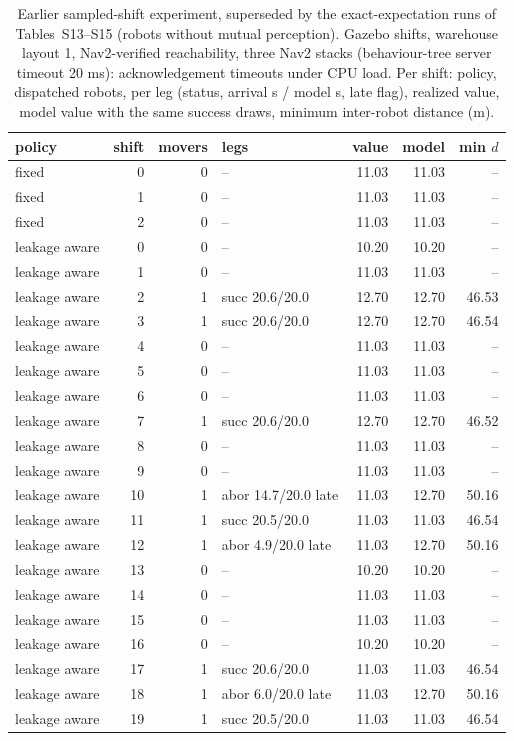 \begin{table}[h]\centering\caption{Earlier sampled-shift experiment, superseded by the exact-expectation runs of Tables~S13--S15 (robots without mutual perception). Gazebo shifts, warehouse layout 1, Nav2-verified reachability, three Nav2 stacks (behaviour-tree server timeout 20 ms): acknowledgement timeouts under CPU load. Per shift: policy, dispatched robots, per leg (status, arrival s / model s, late flag), realized value, model value with the same success draws, minimum inter-robot distance (m).}\scriptsize
\begin{tabular}{@{}lrrp{3.9cm}rrr@{}}\toprule policy & shift & movers & legs & value & model & min $d$\\\midrule
fixed & 0 & 0 & -- & 11.03 & 11.03 & --\\
fixed & 1 & 0 & -- & 11.03 & 11.03 & --\\
fixed & 2 & 0 & -- & 11.03 & 11.03 & --\\
leakage aware & 0 & 0 & -- & 10.20 & 10.20 & --\\
leakage aware & 1 & 0 & -- & 11.03 & 11.03 & --\\
leakage aware & 2 & 1 & succ 20.6/20.0 & 12.70 & 12.70 & 46.53\\
leakage aware & 3 & 1 & succ 20.6/20.0 & 12.70 & 12.70 & 46.54\\
leakage aware & 4 & 0 & -- & 11.03 & 11.03 & --\\
leakage aware & 5 & 0 & -- & 11.03 & 11.03 & --\\
leakage aware & 6 & 0 & -- & 11.03 & 11.03 & --\\
leakage aware & 7 & 1 & succ 20.6/20.0 & 12.70 & 12.70 & 46.52\\
leakage aware & 8 & 0 & -- & 11.03 & 11.03 & --\\
leakage aware & 9 & 0 & -- & 11.03 & 11.03 & --\\
leakage aware & 10 & 1 & abor 14.7/20.0 late & 11.03 & 12.70 & 50.16\\
leakage aware & 11 & 1 & succ 20.5/20.0 & 11.03 & 11.03 & 46.54\\
leakage aware & 12 & 1 & abor 4.9/20.0 late & 11.03 & 12.70 & 50.16\\
leakage aware & 13 & 0 & -- & 10.20 & 10.20 & --\\
leakage aware & 14 & 0 & -- & 11.03 & 11.03 & --\\
leakage aware & 15 & 0 & -- & 11.03 & 11.03 & --\\
leakage aware & 16 & 0 & -- & 10.20 & 10.20 & --\\
leakage aware & 17 & 1 & succ 20.6/20.0 & 11.03 & 11.03 & 46.54\\
leakage aware & 18 & 1 & abor 6.0/20.0 late & 11.03 & 12.70 & 50.16\\
leakage aware & 19 & 1 & succ 20.5/20.0 & 11.03 & 11.03 & 46.54\\
\bottomrule\end{tabular}\end{table}
